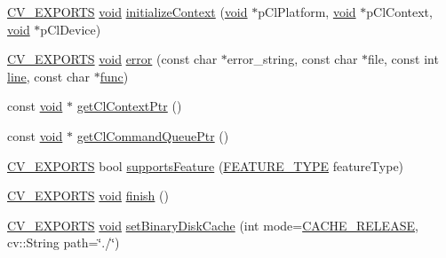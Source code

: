 \begin{DoxyCompactItemize}
\item 
\hyperlink{core_2types__c_8h_a1bf9f0e121b54272da02379cfccd0a2b}{C\-V\-\_\-\-E\-X\-P\-O\-R\-T\-S} \hyperlink{legacy_8hpp_a8bb47f092d473522721002c86c13b94e}{void} \hyperlink{namespacecv_1_1ocl_a760368b228756437a473cd206f930e59}{initialize\-Context} (\hyperlink{legacy_8hpp_a8bb47f092d473522721002c86c13b94e}{void} $\ast$p\-Cl\-Platform, \hyperlink{legacy_8hpp_a8bb47f092d473522721002c86c13b94e}{void} $\ast$p\-Cl\-Context, \hyperlink{legacy_8hpp_a8bb47f092d473522721002c86c13b94e}{void} $\ast$p\-Cl\-Device)
\item 
\hyperlink{core_2types__c_8h_a1bf9f0e121b54272da02379cfccd0a2b}{C\-V\-\_\-\-E\-X\-P\-O\-R\-T\-S} \hyperlink{legacy_8hpp_a8bb47f092d473522721002c86c13b94e}{void} \hyperlink{namespacecv_1_1ocl_a09f9c4420edc6ed8f7cf6c142d829f4e}{error} (const char $\ast$error\-\_\-string, const char $\ast$file, const int \hyperlink{legacy_8hpp_a5a869825573cfaf8861a6ec0fe0f262f}{line}, const char $\ast$\hyperlink{core__c_8h_a120677ac732b3c9bfecab149fc978afa}{func})
\item 
const \hyperlink{legacy_8hpp_a8bb47f092d473522721002c86c13b94e}{void} $\ast$ \hyperlink{namespacecv_1_1ocl_a9e745dd0c466a717e53bf4f29c516b7f}{get\-Cl\-Context\-Ptr} ()
\item 
const \hyperlink{legacy_8hpp_a8bb47f092d473522721002c86c13b94e}{void} $\ast$ \hyperlink{namespacecv_1_1ocl_a55a48c61889cd39be08a5d1f0c0c979c}{get\-Cl\-Command\-Queue\-Ptr} ()
\item 
\hyperlink{core_2types__c_8h_a1bf9f0e121b54272da02379cfccd0a2b}{C\-V\-\_\-\-E\-X\-P\-O\-R\-T\-S} bool \hyperlink{namespacecv_1_1ocl_a7beca753ca1d63370154af38d36e04b6}{supports\-Feature} (\hyperlink{namespacecv_1_1ocl_ae54de1c75af5695402df00cf3baa7be0}{F\-E\-A\-T\-U\-R\-E\-\_\-\-T\-Y\-P\-E} feature\-Type)
\item 
\hyperlink{core_2types__c_8h_a1bf9f0e121b54272da02379cfccd0a2b}{C\-V\-\_\-\-E\-X\-P\-O\-R\-T\-S} \hyperlink{legacy_8hpp_a8bb47f092d473522721002c86c13b94e}{void} \hyperlink{namespacecv_1_1ocl_accf9de7cb84f6c65fadab6eed95f7e5d}{finish} ()
\item 
\hyperlink{core_2types__c_8h_a1bf9f0e121b54272da02379cfccd0a2b}{C\-V\-\_\-\-E\-X\-P\-O\-R\-T\-S} \hyperlink{legacy_8hpp_a8bb47f092d473522721002c86c13b94e}{void} \hyperlink{namespacecv_1_1ocl_a3982700e535361a5385e859f2f07d62d}{set\-Binary\-Disk\-Cache} (int mode=\hyperlink{namespacecv_1_1ocl_a8a8603e6d315c14038f473a015bff967a836bc39d206dcd9c6387ce6bdff8eaf1}{C\-A\-C\-H\-E\-\_\-\-R\-E\-L\-E\-A\-S\-E}, cv\-::\-String path=\char`\"{}./\char`\"{})

\end{DoxyCompactItemize}
